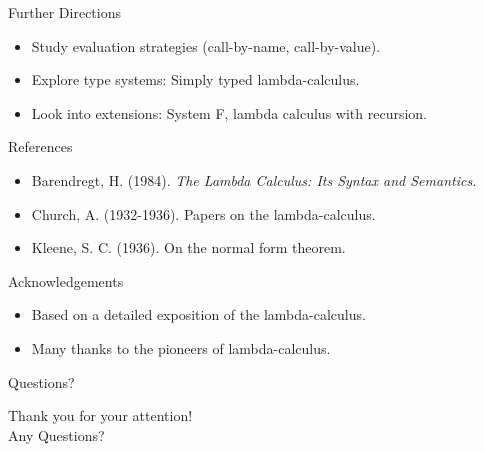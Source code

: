 \documentclass{beamer}
\begin{document}
\begin{frame}{Further Directions}
  \begin{itemize}
    \item Study evaluation strategies (call-by-name, call-by-value).
    \item Explore type systems: Simply typed lambda-calculus.
    \item Look into extensions: System F, lambda calculus with recursion.
  \end{itemize}
\end{frame}

\begin{frame}{References}
  \begin{itemize}
    \item Barendregt, H. (1984). \textit{The Lambda Calculus: Its Syntax and Semantics.}
    \item Church, A. (1932-1936). Papers on the lambda-calculus.
    \item Kleene, S. C. (1936). On the normal form theorem.
  \end{itemize}
\end{frame}

\begin{frame}{Acknowledgements}
  \begin{itemize}
    \item Based on a detailed exposition of the lambda-calculus.
    \item Many thanks to the pioneers of lambda-calculus.
  \end{itemize}
\end{frame}

\begin{frame}{Questions?}
  \begin{center}
    \Large Thank you for your attention!\\[1em]
    Any Questions?
  \end{center}
\end{frame}

\end{document}

